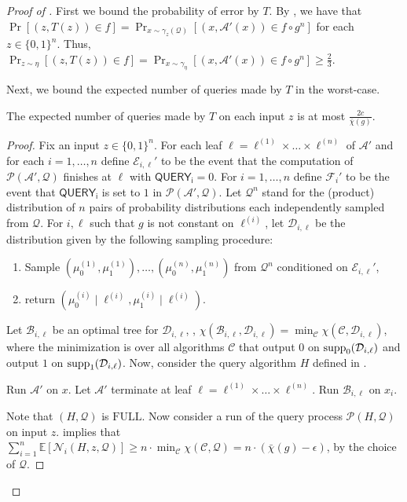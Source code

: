 \documentclass{toc}
\newcommand{\full}{\text{FULL}}
\newcommand\supp{\mathop{\rm supp}}
\newcommand{\cA}{\mathcal{A}}
\newcommand{\clB}{\mathcal{B}}
\newcommand{\clC}{\mathcal{C}}
\newcommand{\clQ}{\mathcal{Q}}
\newcommand{\clP}{\mathcal{P}}
\newcommand{\clN}{\mathcal{N}}
\newcommand{\clD}{\mathcal{D}}
\newcommand{\E}{\mathbb{E}}
\begin{document}
\begin{proof}[Proof of {}]
First we bound the probability of error by $T$. By , we have that
$\Pr[(z, T(z)) \in f]= \Pr_{x \sim \gamma_z(\clQ)}[(x,\cA'(x)) \in f \circ g^n]$ for each $z \in \{0,1\}^n$. 
Thus, $\Pr_{z \sim \eta}[(z, T(z)) \in f]=\Pr_{x \sim \gamma_\eta}[(x,\cA'(x)) \in f \circ g^n] \geq \frac{2}{3}$.

Next, we bound the expected number of queries made by $T$ in the worst-case.
\begin{claim}
The expected number of queries made by $T$ on each input $z$ is at most $\frac{2c}{\bar \chi(g)}$.
\end{claim}

\begin{proof}
Fix an input $z \in \{0,1\}^n$. For each leaf $\ell=\ell^{(1)} \times \ldots \times \ell^{(n)}$ of $\cA'$ and for each $i=1, \ldots, n$ define $\mathcal{E}_{i, \ell}'$ to be the event that the computation of $\clP(\cA',\clQ)$ finishes at $\ell$ with 
$\mathsf{QUERY_i}=0$. For $i=1, \ldots,n$ define $\mathcal{F}_i'$ to be the event that $\mathsf{QUERY_i}$ is set to $1$ in $\clP(\cA',\clQ)$. Let $\clQ^n$ stand for the (product) distribution of $n$ pairs of probability distributions each independently sampled from $\clQ$. For $i, \ell$ such that $g$ is not constant on $\ell^{(i)}$, let $\clD_{i, \ell}$ be the distribution given by the following sampling procedure:
\begin{enumerate}
\item Sample $(\mu_0^{(1)}, \mu_1^{(1)}), \ldots, (\mu_0^{(n)}, \mu_1^{(n)})$ from $\clQ^n$ conditioned on $\mathcal{E}_{i,\ell}'$,
\item return $(\mu_0^{(i)} \mid \ell^{(i)}, \mu_1^{(i)} \mid \ell^{(i)})$.
\end{enumerate}Let $\clB_{i,\ell}$ be an optimal tree for $\clD_{i,\ell}$, \ie, $\chi(\clB_{i,\ell},\clD_{i,\ell})=\min_{\clC}\chi(\clC, \clD_{i,\ell})$, where the minimization is over all algorithms $\clC$ that output $0$ on 
$\supp_0(\clD_{i,\ell})$ and output $1$ on $\supp_1(\clD_{i,\ell})$. Now, consider the query algorithm $H$ defined in .
\begin{algorithm}[!h]
\DontPrintSemicolon
\caption{ $H$}
\label{Qz}
Run $\cA'$ on $x$. \;\label{runT}
Let $\cA'$ terminate at leaf $\ell=\ell^{(1)} \times \ldots \times\ell^{(n)}$. \;
{
{Run $\clB_{i, \ell}$ on $x_i$. \; \label{runP}}}
\end{algorithm}
Note that $(H, \clQ)$ is $\full$. Now consider a run of the query process $\clP(H, \clQ)$ on input $z$.  implies that $\sum_{i=1}^n \E[\clN_i(H,z, \clQ)] \geq n \cdot \min_{\clC} \chi(\clC,\clQ) =n \cdot (\bar\chi(g)-\epsilon)$, 
by the choice of $\clQ$. 


\end{proof}
\end{proof}
\end{document}
